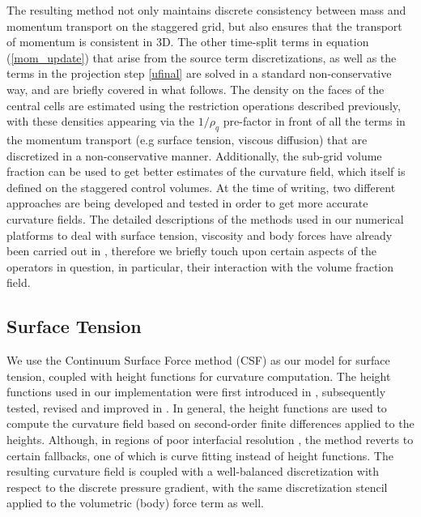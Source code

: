 The resulting method not only maintains discrete consistency between
mass and momentum transport on the staggered grid, but also ensures that
the transport of momentum is consistent in 3D.
The other time-split terms in equation (\ref{mom_update}) 
that arise from the source term discretizations, as well 
as the terms in the projection step \eqref{ufinal} are solved in 
a standard non-conservative way, and are briefly covered in what follows. 
The density on the faces of the central cells 
are estimated using the restriction operations
described previously, with these densities appearing 
via the $ 1 / \rho_q $ pre-factor in front of all
the terms in the momentum transport (e.g surface tension, viscous diffusion) 
that are discretized in a non-conservative manner. 
Additionally, the sub-grid volume fraction
can be used to get better estimates of the curvature field, which
itself is defined on the staggered control volumes. 
At the time of writing, two different approaches are being 
developed and tested in order to get more accurate curvature fields. 
The detailed descriptions of the methods used in our 
numerical platforms to deal with surface tension,
viscosity and body forces have already been carried 
out in \cite{paris, basilisk, popinet2009accurate}, 
therefore we briefly touch upon certain aspects of the 
operators in question, in particular, 
their interaction with the volume fraction field.

\subsection*{Surface Tension}
We use the Continuum Surface Force method (CSF) as our model for surface tension, 
coupled with height functions for curvature computation. 
The height functions used in our implementation were first introduced in \cite{popinet2009accurate}
, subsequently tested, revised and improved in \cite{bornia2011properties,owkes2015mesh}. 
In general, the height functions are used to compute the curvature field based 
on second-order finite differences applied to the heights. 
Although, in regions of poor interfacial resolution 
, 
the method reverts to certain fallbacks, one of which is curve fitting instead of height functions.  
The resulting curvature field is coupled with a well-balanced discretization with
respect to the discrete pressure gradient, with the same discretization 
stencil applied to the volumetric (body) force term as well. 


